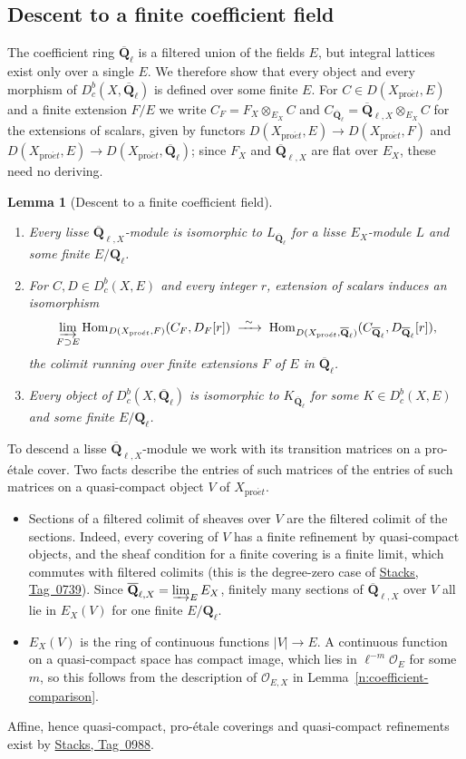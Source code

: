 \documentclass[11pt,a4paper]{article}
\numberwithin{equation}{section}
\newtheorem{lemma}[theorem]{Lemma}
\theoremstyle{definition}
\theoremstyle{remark}
\newcommand{\D}{D}
\newcommand{\Dbc}{D^b_c}
\newcommand{\Qbar}{\overline{\mathbf Q}_\ell}
\newcommand{\Ql}{\mathbf Q_\ell}
\newcommand{\proet}{\mathrm{pro}\acute{e}t}
\newcommand{\stacks}[1]{\href{https://stacks.math.columbia.edu/tag/#1}{\textnormal{Stacks, Tag~#1}}}
\newcommand{\Hom}{\operatorname{Hom}}
\newcommand{\QbarX}{\overline{\mathbf Q}_{\ell,X}}
\begin{document}
\subsection{Descent to a finite coefficient field}

The coefficient ring $\Qbar$ is a filtered union of the fields $E$, but
integral lattices exist only over a single $E$. We therefore show that
every object and every morphism of $\Dbc(X,\Qbar)$ is defined over some
finite $E$. For $C\in\D(X_{\proet},E)$ and a finite extension $F/E$ we
write $C_F=F_X\otimes_{E_X}C$ and $C_{\Qbar}=\QbarX\otimes_{E_X}C$ for the
extensions of scalars, given by functors
$\D(X_{\proet},E)\to\D(X_{\proet},F)$ and
$\D(X_{\proet},E)\to\D(X_{\proet},\Qbar)$; since $F_X$ and $\QbarX$ are flat over $E_X$, these
need no deriving.

\begin{lemma}[Descent to a finite coefficient field]
\label{b:lem:coefficient-finite-descent}
\leavevmode
\begin{enumerate}
\item Every lisse $\QbarX$-module is isomorphic to $L_{\Qbar}$ for a lisse
  $E_X$-module $L$ and some finite $E/\Ql$.
\item For $C,D\in\Dbc(X,E)$ and every integer $r$, extension of scalars
  induces an isomorphism
  \[
   \varinjlim_{F\supset E}
   \Hom_{\D(X_{\proet},F)}(C_F,D_F[r])
   \;\xrightarrow{\ \sim\ }\;
   \Hom_{\D(X_{\proet},\Qbar)}(C_{\Qbar},D_{\Qbar}[r]),
  \]
  the colimit running over finite extensions $F$ of $E$ in $\Qbar$.
\item Every object of $\Dbc(X,\Qbar)$ is isomorphic to $K_{\Qbar}$ for
  some $K\in\Dbc(X,E)$ and some finite $E/\Ql$.
\end{enumerate}
\end{lemma}

To descend a lisse $\QbarX$-module we work with its transition matrices on a
pro-\'etale cover. Two facts describe the entries of such matrices of the entries of such matrices
on a quasi-compact object $V$ of $X_{\proet}$.
\begin{itemize}
\item Sections of a filtered colimit of sheaves over $V$ are the filtered
  colimit of the sections. Indeed, every covering of $V$ has a finite
  refinement by quasi-compact objects, and the sheaf condition for a
  finite covering is a finite limit, which commutes with filtered
  colimits (this is the degree-zero case of \stacks{0739}). Since
  $\QbarX=\varinjlim_EE_X$, finitely many sections of $\QbarX$ over $V$
  all lie in $E_X(V)$ for one finite $E/\Ql$.
\item $E_X(V)$ is the ring of continuous functions $|V|\to E$. A
  continuous function on a quasi-compact space has compact image, which
  lies in $\ell^{-m}\mathcal O_E$ for some $m$, so this follows from the
  description of $\mathcal O_{E,X}$ in
  Lemma~\ref{n:coefficient-comparison}.
\end{itemize}
Affine, hence quasi-compact, pro-\'etale coverings and quasi-compact
refinements exist by \stacks{0988}.
\end{document}
